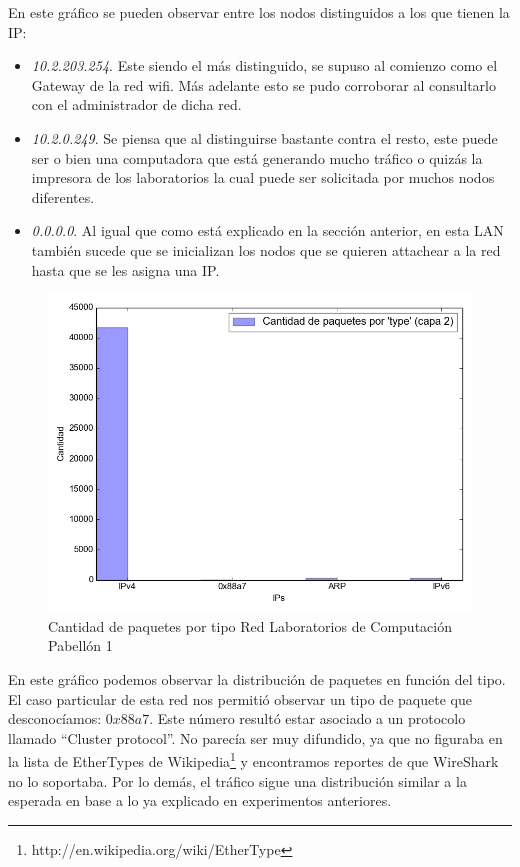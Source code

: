 \indent En este gráfico se pueden observar entre los nodos distinguidos a los que tienen la IP:
\begin{itemize}
	\item \textit{10.2.203.254}. Este siendo el más distinguido, se supuso al comienzo como el Gateway de la red wifi. Más adelante esto se pudo corroborar al consultarlo con el administrador de dicha red.
    \item \textit{10.2.0.249}. Se piensa que al distinguirse bastante contra el resto, este puede ser o bien una computadora que está generando mucho tráfico o quizás la impresora de los laboratorios la cual puede ser solicitada por muchos nodos diferentes.
    \item \textit{0.0.0.0}. Al igual que como está explicado en la sección anterior, en esta LAN también sucede que se inicializan los nodos que se quieren attachear a la red hasta que se les asigna una IP.
\end{itemize}


\FloatBarrier
\begin{center}
	\begin{figure}[ht]
    	\centering
		\includegraphics[width=12cm]{imgs/output_laski_labos_p-pkgs_by_type.png}
		\caption{Cantidad de paquetes por tipo Red Laboratorios de Computación Pabellón 1}
	\end{figure}
\end{center}

En este gráfico podemos observar la distribución de paquetes en función del tipo.
El caso particular de esta red nos permitió observar un tipo de paquete que desconocíamos: $0x88a7$. Este número resultó estar asociado a un protocolo llamado ``Cluster protocol''. No parecía ser muy difundido, ya que no figuraba en la lista de EtherTypes de Wikipedia\footnote{http://en.wikipedia.org/wiki/EtherType} y encontramos reportes de que WireShark no lo soportaba.
Por lo demás, el tráfico sigue una distribución similar a la esperada en base a lo ya explicado en experimentos anteriores.

\FloatBarrier




